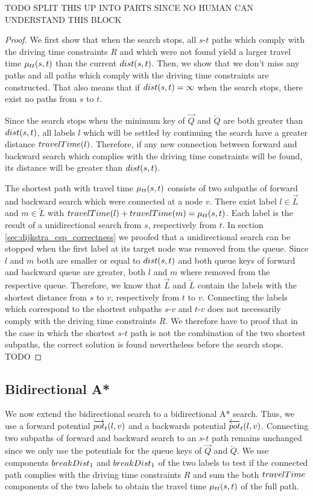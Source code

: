 TODO SPLIT THIS UP INTO PARTS SINCE NO HUMAN CAN UNDERSTAND THIS BLOCK

\begin{proof}
	We first show that when the search stops, all $s$-$t$ paths which comply with the driving time constraints $R$ and which were not found yield a larger travel time $\mu_{tt}(s,t)$ than the current $dist(s,t)$. Then, we show that we don't miss any paths and all paths which comply with the driving time constraints are constructed. That also means that if $dist(s,t) = \infty$ when the search stops, there exist no paths from $s$ to $t$.

	Since the search stops when the minimum key of $\overrightarrow{Q}$ and $\overleftarrow{Q}$ are both greater than $dist(s,t)$, all labels $l$ which will be settled by continuing the search have a greater distance $travelTime(l)$. Therefore, if any new connection between forward and backward search which complies with the driving time constraints will be found, its distance will be greater than $dist(s,t)$.

	The shortest path with travel time $\mu_{tt}(s,t)$ consists of two subpaths of forward and backward search which were connected at a node $v$. There exist label $l \in \overrightarrow{L}$ and $m \in \overleftarrow{L}$ with $travelTime(l) + travelTime(m) = \mu_{tt}(s,t)$. Each label is the result of a unidirectional search from $s$, respectively from $t$. In section \ref{sec:dijkstra_csp_correctness} we proofed that a unidirectional search can be stopped when the first label at its target node was removed from the queue. Since $l$ and $m$ both are smaller or equal to $dist(s,t)$ and both queue keys of forward and backward queue are greater, both $l$ and $m$ where removed from the respective queue. Therefore, we know that $\overrightarrow{L}$ and $\overleftarrow{L}$ contain the labels with the shortest distance from $s$ to $v$, respectively from $t$ to $v$. Connecting the labels which correspond to the shortest subpaths $s$-$v$ and $t$-$v$ does not necessarily comply with the driving time constraints $R$. We therefore have to proof that in the case in which the shortest $s$-$t$ path is not the combination of the two shortest subpaths, the correct solution is found nevertheless before the search stops. TODO
\end{proof}

\subsection{Bidirectional A*}
We now extend the bidirectional search to a bidirectional A* search. Thus, we use a forward potential $\overrightarrow{pot}_t(l,v)$ and a backwards potential $\overleftarrow{pot}_t(l,v)$. Connecting two subpaths of forward and backward search to an $s$-$t$ path remains unchanged since we only use the potentials for the queue keys of $\overrightarrow{Q}$ and $\overleftarrow{Q}$. We use components $breakDist_1$ and $breakDist_1$ of the two labels to test if the connected path complies with the driving time constraints $R$ and sum the both $travelTime$ components of the two labels to obtain the travel time $\mu_{tt}(s,t)$ of the full path.

